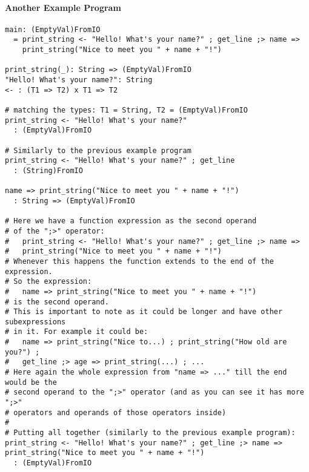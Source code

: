 \documentclass{article}
\begin{document}
\newpage
\paragraph{Another Example Program}
\begin{verbatim}
main: (EmptyVal)FromIO
  = print_string <- "Hello! What's your name?" ; get_line ;> name =>
    print_string("Nice to meet you " + name + "!")

print_string(_): String => (EmptyVal)FromIO
"Hello! What's your name?": String
<- : (T1 => T2) x T1 => T2

# matching the types: T1 = String, T2 = (EmptyVal)FromIO
print_string <- "Hello! What's your name?"
  : (EmptyVal)FromIO

# Similarly to the previous example program
print_string <- "Hello! What's your name?" ; get_line
  : (String)FromIO

name => print_string("Nice to meet you " + name + "!")
  : String => (EmptyVal)FromIO

# Here we have a function expression as the second operand
# of the ";>" operator:
#   print_string <- "Hello! What's your name?" ; get_line ;> name =>
#   print_string("Nice to meet you " + name + "!")
# Whenever this happens the function extends to the end of the expression.
# So the expression:
#   name => print_string("Nice to meet you " + name + "!")
# is the second operand.
# This is important to note as it could be longer and have other subexpressions
# in it. For example it could be:
#   name => print_string("Nice to...) ; print_string("How old are you?") ;
#   get_line ;> age => print_string(...) ; ...
# Here again the whole expression from "name => ..." till the end would be the
# second operand to the ";>" operator (and as you can see it has more ";>"
# operators and operands of those operators inside)
#
# Putting all together (similarly to the previous example program):
print_string <- "Hello! What's your name?" ; get_line ;> name =>
print_string("Nice to meet you " + name + "!")
  : (EmptyVal)FromIO
\end{verbatim}
\end{document}
